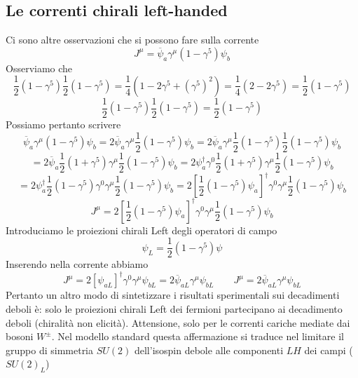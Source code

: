 \subsection{Le correnti chirali left-handed}
Ci sono altre osservazioni che si possono fare sulla corrente
$$
J^\mu = \overline{\psi}_a \gamma^\mu (1 - \gamma^5) \psi_b
$$
Osserviamo che
$$
\frac{1}{2}(1 - \gamma^5)\frac{1}{2}(1 - \gamma^5) = \frac{1}{4}(1 - 2\gamma^5 + (\gamma^5)^2) = \frac{1}{4}(2 - 2\gamma^5) = \frac{1}{2}(1 - \gamma^5)
$$
$$
\frac{1}{2}(1 - \gamma^5)\frac{1}{2}(1 - \gamma^5) = \frac{1}{2}(1 - \gamma^5)
$$
Possiamo pertanto scrivere
$$
\overline{\psi}_a \gamma^\mu (1 - \gamma^5) \psi_b = 2\overline{\psi}_a \gamma^\mu \frac{1}{2}(1 - \gamma^5) \psi_b = 2\overline{\psi}_a \gamma^\mu \frac{1}{2}(1 - \gamma^5) \frac{1}{2}(1 - \gamma^5) \psi_b
$$
$$
= 2\overline{\psi}_a \frac{1}{2}(1 + \gamma^5) \gamma^\mu \frac{1}{2}(1 - \gamma^5) \psi_b = 2\psi_a^\dagger \gamma^0 \frac{1}{2}(1 + \gamma^5) \gamma^\mu \frac{1}{2}(1 - \gamma^5) \psi_b
$$
$$
= 2\psi_a^\dagger \frac{1}{2}(1 - \gamma^5) \gamma^0 \gamma^\mu \frac{1}{2}(1 - \gamma^5) \psi_b = 2 \left[ \frac{1}{2}(1 - \gamma^5) \psi_a \right]^\dagger \gamma^0 \gamma^\mu \frac{1}{2}(1 - \gamma^5) \psi_b
$$
$$
J^\mu = 2 \left[ \frac{1}{2} (1 - \gamma^5) \psi_a \right]^\dagger \gamma^0 \gamma^\mu \frac{1}{2} (1 - \gamma^5) \psi_b
$$
Introduciamo le proiezioni chirali Left degli operatori di campo
$$
\psi_L = \frac{1}{2} (1 - \gamma^5) \psi
$$
Inserendo nella corrente abbiamo
$$
J^\mu = 2 [\psi_{aL}]^\dagger \gamma^0 \gamma^\mu \psi_{bL} = 2 \overline{\psi}_{aL} \gamma^\mu \psi_{bL} \qquad J^\mu = 2 \overline{\psi}_{aL} \gamma^\mu \psi_{bL}
$$
Pertanto un altro modo di sintetizzare i risultati sperimentali sui decadimenti deboli è: solo le proiezioni chirali Left dei fermioni partecipano ai decadimento deboli (chiralità non elicità). Attensione, solo per le correnti cariche mediate dai bosoni $W^{\pm}$. Nel modello standard questa affermazione si traduce nel limitare il gruppo di simmetria $SU(2)$ dell'isospin debole alle componenti $LH$ dei campi ($SU(2)_L$)
